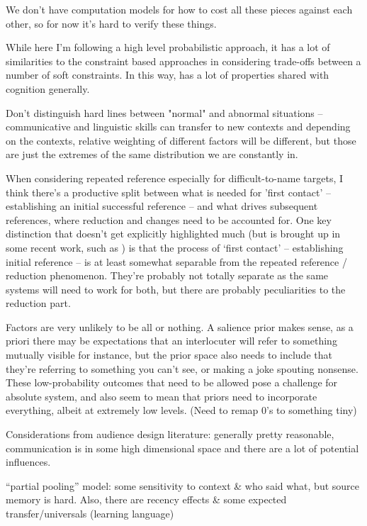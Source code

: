 \documentclass[]{article}
\begin{document}
We don't have computation models for how to cost all these pieces against each other, so for now it's hard to verify these things. 

While here I'm following a high level probabilistic approach, it has a lot of similarities to the constraint based approaches in considering trade-offs between a number of soft constraints. In this way, has a lot of properties shared with cognition generally. 

Don't distinguish hard lines between "normal" and abnormal situations -- communicative and linguistic skills can transfer to new contexts and depending on the contexts, relative weighting of different factors will be different, but those are just the extremes of the same distribution we are constantly in. 

When considering repeated reference especially for difficult-to-name targets, I think there's a productive split between what is needed for 'first contact' -- establishing an initial successful reference -- and what drives subsequent references, where reduction and changes need to be accounted for. One key distinction that doesn't get explicitly highlighted much (but is brought up in some recent work, such as \cite{leung2023}) is that the process of `first contact' -- establishing initial reference -- is at least somewhat separable from the repeated reference / reduction phenomenon. They're probably not totally separate as the same systems will need to work for both, but there are probably peculiarities to the reduction part. 

Factors are very unlikely to be all or nothing. A salience prior makes sense, as a priori there may be expectations that an interlocuter will refer to something mutually visible for instance, but the prior space also needs to include that they're referring to something you can't see, or making a joke spouting nonsense. These low-probability outcomes that need to be allowed pose a challenge for absolute system, and also seem to mean that priors need to incorporate everything, albeit at extremely low levels. (Need to remap 0's to something tiny) 

Considerations from audience design literature: generally pretty reasonable, communication is in some high dimensional space and there are a lot of potential influences. 

``partial pooling'' model: some sensitivity to context \& who said what, but source memory is hard. Also, there are recency effects \& some expected transfer/universals (learning language) 
\end{document}
